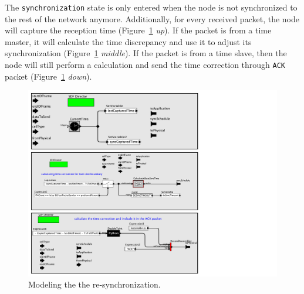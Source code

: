 The \texttt{synchronization} state is only entered when the node is not synchronized to the rest of the network anymore. Additionally, for every received packet, the node will capture the reception time (Figure~\ref{fig:timeCorrection} {\em up}). If the packet is from a time master, it will calculate the time discrepancy and use it to adjust its synchronization (Figure~\ref{fig:timeCorrection} {\em middle}). If the packet is from a time slave, then the node will still perform a calculation and send the time correction through \texttt{ACK} packet (Figure~\ref{fig:timeCorrection} {\em down}).

\begin{figure}[t]
\centering
\includegraphics[width=0.9\columnwidth]{figures/PaperReSynchronization}
\caption{Modeling the the re-synchronization.}
\label{fig:timeCorrection}
\end{figure}

